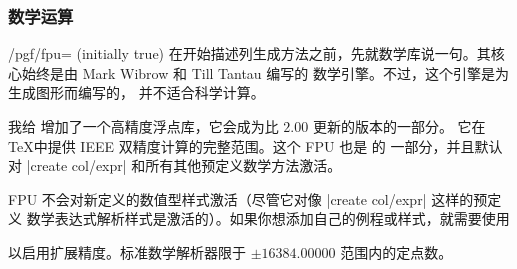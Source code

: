 \documentclass[a4paper,doc2]{ltxdoc}
\begin{document}
\subsubsection{数学运算}

\begin{key}{/pgf/fpu= (initially true)}
    在开始描述列生成方法之前，先就数学库说一句。其核心始终是由 Mark Wibrow 和
    Till Tantau 编写的 \PGF{} 数学引擎。不过，这个引擎是为生成图形而编写的，
    并不适合科学计算。

    我给 \PGF{} 增加了一个高精度浮点库，它会成为比 \PGF{} $2.00$ 更新的版本的一部分。
    它在 \TeX 中提供 IEEE 双精度计算的完整范围。这个 FPU 也是 \PGFPlotstable{} 的
    一部分，并且默认对 |create col/expr| 和所有其他预定义数学方法激活。

    FPU 不会对新定义的数值型样式激活（尽管它对像 |create col/expr| 这样的预定义
    数学表达式解析样式是激活的）。如果你想添加自己的例程或样式，就需要使用
\begin{codeexample}
\end{codeexample}
    \noindent 以启用扩展精度。标准数学解析器限于 $\pm 16384.00000$ 范围内的定点数。
\end{key}
\end{document}
